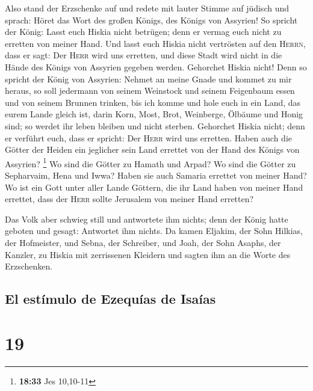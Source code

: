  Also stand der Erzschenke auf und redete mit lauter
Stimme auf jüdisch und sprach: Höret das Wort des großen Königs, des
Königs von Assyrien!  So spricht der König: Lasst euch
Hiskia nicht betrügen; denn er vermag euch nicht zu erretten von meiner
Hand.  Und lasst euch Hiskia nicht vertrösten auf den
\textsc{Herrn}, dass er sagt: Der \textsc{Herr} wird uns erretten, und
diese Stadt wird nicht in die Hände des Königs von Assyrien gegeben
werden.  Gehorchet Hiskia nicht! Denn so spricht der
König von Assyrien: Nehmet an meine Gnade und kommet zu mir heraus, so
soll jedermann von seinem Weinstock und seinem Feigenbaum essen und von
seinem Brunnen trinken,  bis ich komme und hole euch in
ein Land, das eurem Lande gleich ist, darin Korn, Most, Brot, Weinberge,
Ölbäume und Honig sind; so werdet ihr leben bleiben und nicht sterben.
Gehorchet Hiskia nicht; denn er verführt euch, dass er spricht: Der
\textsc{Herr} wird uns erretten.  Haben auch die Götter
der Heiden ein jeglicher sein Land errettet von der Hand des Königs von
Assyrien? \footnote{\textbf{18:33} Jes 10,10-11}  Wo sind
die Götter zu Hamath und Arpad? Wo sind die Götter zu Sepharvaim, Hena
und Iwwa? Haben sie auch Samaria errettet von meiner Hand?
 Wo ist ein Gott unter aller Lande Göttern, die ihr Land
haben von meiner Hand errettet, dass der \textsc{Herr} sollte Jerusalem
von meiner Hand erretten?

 Das Volk aber schwieg still und antwortete ihm nichts;
denn der König hatte geboten und gesagt: Antwortet ihm nichts.
 Da kamen Eljakim, der Sohn Hilkias, der Hofmeister, und
Sebna, der Schreiber, und Joah, der Sohn Asaphs, der Kanzler, zu Hiskia
mit zerrissenen Kleidern und sagten ihm an die Worte des Erzschenken.

\hypertarget{el-estuxedmulo-de-ezequuxedas-de-isauxedas}{%
\subsection{El estímulo de Ezequías de
Isaías}\label{el-estuxedmulo-de-ezequuxedas-de-isauxedas}}

\hypertarget{section-18}{%
\section{19}\label{section-18}}


